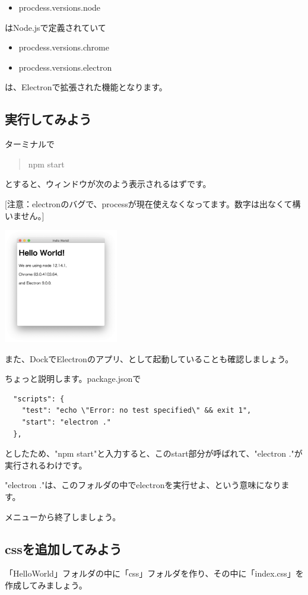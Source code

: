 \documentclass[mingoth,11pt,a4j,uplatex]{jsarticle}
\begin{document}
\begin{itemize}
\item procdess.versions.node
\end{itemize}
はNode.jsで定義されていて
\begin{itemize}
\item procdess.versions.chrome
\item procdess.versions.electron
\end{itemize}
は、Electronで拡張された機能となります。

\subsection{実行してみよう}
ターミナルで
\begin{quote}
npm start
\end{quote}
とすると、ウィンドウが次のよう表示されるはずです。

[注意：electronのバグで、processが現在使えなくなってます。数字は出なくて構いません。]

\includegraphics[width=5cm]{img/helloworld.png}

また、DockでElectronのアプリ、として起動していることも確認しましょう。

ちょっと説明します。package.jsonで
\begin{verbatim}
  "scripts": {
    "test": "echo \"Error: no test specified\" && exit 1",
    "start": "electron ."
  },
\end{verbatim}
としたため、"npm start"と入力すると、このstart部分が呼ばれて、"electron ."が実行されるわけです。

"electron ."は、このフォルダの中でelectronを実行せよ、という意味になります。

メニューから終了しましょう。

\subsection{cssを追加してみよう}
「HelloWorld」フォルダの中に「css」フォルダを作り、その中に「index.css」を作成してみましょう。
\end{document}
